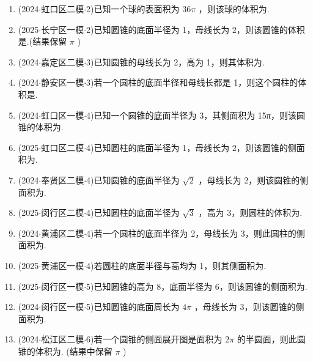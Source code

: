 \begin{enumerate}
    \item (2024$\cdot$虹口区二模$\cdot$2)已知一个球的表面积为 ${36\pi }$ ，则该球的体积为\blkda[2]{${36\pi }$}.

    \item (2025$\cdot$长宁区一模$\cdot$2)已知圆锥的底面半径为 1，母线长为 2，则该圆锥的体积是.(结果保留 $\pi$ )

    \item (2024$\cdot$嘉定区二模$\cdot$3)已知圆锥的母线长为 2，高为 1，则其体积为\blkda[2]{$\pi$}.

    \item (2024$\cdot$静安区一模$\cdot$3)若一个圆柱的底面半径和母线长都是 1，则这个圆柱的体积是\blkda[2]{$\pi$}.

    \item (2024$\cdot$虹口区一模$\cdot$4)已知一个圆锥的底面半径为 3，其侧面积为 15π，则该圆锥的体积为\blkda[2]{${12\pi}$}.

    \item (2025$\cdot$虹口区二模$\cdot$4)已知圆柱的底面半径为 1，母线长为 2，则该圆锥的侧面积为\blkda[2]{${4\pi}$}.

    \item (2024$\cdot$奉贤区二模$\cdot$4)已知圆锥的底面半径为 $\sqrt{2}$ ，母线长为 2，则该圆锥的侧面积为.

    \item (2025$\cdot$闵行区二模$\cdot$4)已知圆柱的底面半径为 $\sqrt{3}$ ，高为 3，则圆柱的体积为\blkda[2]{${9\pi }$}.

    \item (2024$\cdot$黄浦区二模$\cdot$4)若一个圆柱的底面半径为 2，母线长为 3，则此圆柱的侧面积为\blkda[2]{${12\pi }$}.

    \item (2025$\cdot$黄浦区一模$\cdot$4)若圆柱的底面半径与高均为 1，则其侧面积为\blkda[2]{${2\pi }$}.

    \item (2025$\cdot$闵行区一模$\cdot$5)已知圆锥的高为 8，底面半径为 6，则该圆锥的侧面积为\blkda[2]{${60\pi }$}.

    \item (2024$\cdot$闵行区一模$\cdot$5)已知圆锥的底面周长为 ${4\pi }$ ，母线长为 3，则该圆锥的侧面积为\blkda[2]{${6\pi }$}.

    \item (2024$\cdot$松江区二模$\cdot$6)若一个圆锥的侧面展开图是面积为 ${2\pi }$ 的半圆面，则此圆锥的体积为. (结果中保留 $\pi$ )


\end{enumerate}
